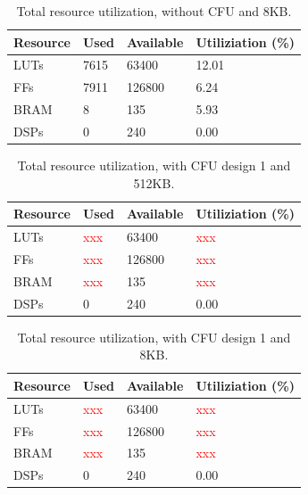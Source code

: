 \begin{table}[H]
\centering
\caption{Total resource utilization, without CFU and 8KB.}
\begin{tabular}{|l|l|l|l|}
\hline
Resource & Used & Available & Utiliziation (\%) \\ \hline
LUTs     & 7615 & 63400     & 12.01              \\ \hline
FFs      & 7911 & 126800    & 6.24              \\ \hline
BRAM     & 8    & 135       & 5.93              \\ \hline
DSPs     & 0    & 240       & 0.00              \\ \hline
\end{tabular}
\label{tab:}
\end{table}

\begin{table}[H]
\centering
\caption{Total resource utilization, with CFU design 1 and 512KB.}
\begin{tabular}{|l|l|l|l|}
\hline
Resource & Used & Available & Utiliziation (\%) \\ \hline
LUTs     & \textcolor{red}{xxx} & 63400     & \textcolor{red}{xxx}              \\ \hline
FFs      & \textcolor{red}{xxx} & 126800    & \textcolor{red}{xxx}              \\ \hline
BRAM     & \textcolor{red}{xxx}    & 135       & \textcolor{red}{xxx}              \\ \hline
DSPs     & 0    & 240       & 0.00              \\ \hline
\end{tabular}
\label{tab:}
\end{table}

\begin{table}[H]
\centering
\caption{Total resource utilization, with CFU design 1 and 8KB.}
\begin{tabular}{|l|l|l|l|}
\hline
Resource & Used & Available & Utiliziation (\%) \\ \hline
LUTs     & \textcolor{red}{xxx} & 63400     & \textcolor{red}{xxx}              \\ \hline
FFs      & \textcolor{red}{xxx} & 126800    & \textcolor{red}{xxx}              \\ \hline
BRAM     & \textcolor{red}{xxx}    & 135       & \textcolor{red}{xxx}              \\ \hline
DSPs     & 0    & 240       & 0.00              \\ \hline
\end{tabular}
\label{tab:}
\end{table}

